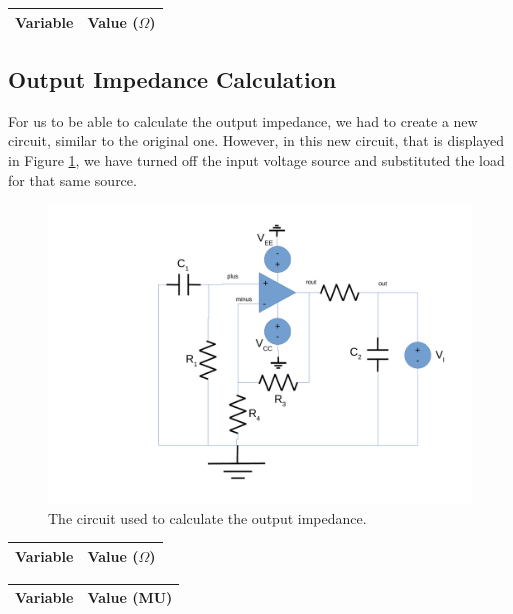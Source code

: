 \begin{center}
\begin{tabular}{|l|r|}
  \hline    
  {\bf Variable} & {\bf Value ($\Omega$)} \\ \hline
  
\end{tabular}
\end{center}

\subsection{Output Impedance Calculation}

For us to be able to calculate the output impedance, we had to create a new circuit, similar to the original one. However, in this new circuit, that is displayed in Figure \ref{fig:circuit-out}, we have turned off the input voltage source and substituted the load for that same source.

\begin{figure}[h] \centering
\includegraphics[width=0.6\linewidth]{circuit-out.pdf}
\caption{The circuit used to calculate the output impedance.}
\label{fig:circuit-out}
\end{figure}

\begin{center}
\begin{tabular}{|l|r|}
  \hline    
  {\bf Variable} & {\bf Value ($\Omega$)} \\ \hline
  
\end{tabular}
\end{center}

\begin{center}
\begin{tabular}{|l|r|}
  \hline    
  {\bf Variable} & {\bf Value (MU)} \\ \hline
  
\end{tabular}
\end{center}

